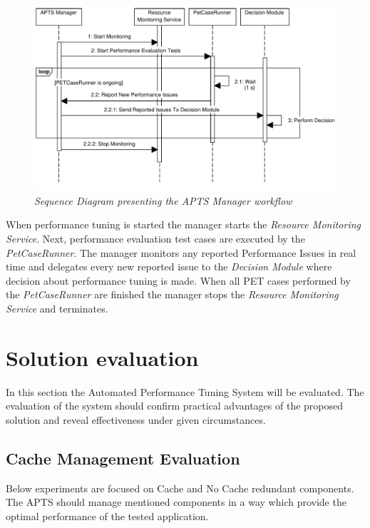 \documentclass[10pt,a4paper]{article}
\begin{document}
\begin{figure}[!htb]
\centering
\includegraphics[width=1\textwidth]{ManagerSequenceDiagram}
\caption{\textit{Sequence Diagram presenting the APTS Manager workflow}} \label{manager}
\end{figure}


When performance tuning is started the manager starts the \textit{Resource Monitoring Service}. Next, performance evaluation test cases are executed by the \textit{PetCaseRunner}. The manager monitors any reported Performance Issues in real time and delegates every new reported issue to the \textit{Decision Module} where decision about performance tuning is made. When all PET cases performed by the \textit{PetCaseRunner} are finished the manager stops the \textit{Resource Monitoring Service} and terminates. 

\section{Solution evaluation} 

In this section the Automated Performance Tuning System will be evaluated. The evaluation of the system should confirm practical advantages of the proposed solution and reveal effectiveness under given circumstances. 

\subsection{Cache Management Evaluation}

Below experiments are focused on Cache and No Cache redundant components. The APTS should manage mentioned components in a way which provide the optimal performance of the tested application.
\end{document}
